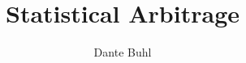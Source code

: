 \documentclass{article}
\begin{document}
\title{Statistical Arbitrage}
\author{Dante Buhl}


\newcommand{\wrms}{w_{\text{rms}}}
\newcommand{\Var}{\text{Var}}
\newcommand{\bs}[1]{\boldsymbol{#1}}
\newcommand{\hbs}[1]{\hat{\boldsymbol{#1}}}
\newcommand{\tb}[1]{\textbf{#1}}
\newcommand{\bmp}[1]{\begin{minipage}{#1\textwidth}}
\newcommand{\emp}{\end{minipage}}
\newcommand{\R}{\mathbb{R}}
\newcommand{\C}{\mathbb{C}}
\newcommand{\N}{\mathcal{N}}
\newcommand{\m}{\bs{\mu}_*}
\newcommand{\s}{\bs{\Sigma}_*}
\newcommand{\dt}{\Delta t}
\newcommand{\dx}{\Delta x}
\newcommand{\tr}[1]{\text{Tr}(#1)}
\newcommand{\Tr}[1]{\text{Tr}(#1)}
\newcommand{\Div}{\nabla \cdot}
\renewcommand{\div}{\nabla \cdot}
\newcommand{\Curl}{\nabla \times}
\newcommand{\Grad}{\nabla}
\newcommand{\grad}{\nabla}
\newcommand{\grads}{\nabla_s}
\newcommand{\gradf}{\nabla_f}
\newcommand{\xs}{x_s}
\newcommand{\x}{\bs{x}}
\newcommand{\xf}{x_f}
\newcommand{\ts}{t_s}
\newcommand{\tf}{t_f}
\newcommand{\pt}{\partial t}
\newcommand{\pz}{\partial z}
\newcommand{\uvec}{\bs{u}}
\newcommand{\bvec}{\bs{B}}
\newcommand{\nvec}{\hat{\bs{n}}}
\newcommand{\tu}{\tilde{\uvec}}
\newcommand{\B}{\bs{B}}
\newcommand{\A}{\bs{A}}
\newcommand{\jvec}{\bs{j}}
\newcommand{\F}{\bs{F}}
\newcommand{\T}{\tilde{T}}
\newcommand{\ez}{\bs{e}_z}
\newcommand{\ex}{\bs{e}_x}
\newcommand{\ey}{\bs{e}_y}
\newcommand{\eo}{\bs{e}_{\bs{\Omega}}}
\newcommand{\ppt}[1]{\frac{\partial #1}{\partial t}}
\newcommand{\pp}[2]{\frac{\partial #1}{\partial #2}}
\newcommand{\pptwo}[2]{\frac{\partial^2 #1}{\partial #2^2}}
\newcommand{\ddtwo}[2]{\frac{d^2 #1}{d #2^2}}
\newcommand{\DDt}[1]{\frac{D #1}{D t}}
\newcommand{\ppts}[1]{\frac{\partial #1}{\partial t_s}}
\newcommand{\pptf}[1]{\frac{\partial #1}{\partial t_f}}
\newcommand{\ppz}[1]{\frac{\partial #1}{\partial z}}
\newcommand{\ddz}[1]{\frac{d #1}{d z}}
\newcommand{\ppzetas}[1]{\frac{\partial^2 #1}{\partial \zeta^2}}
\newcommand{\ppzs}[1]{\frac{\partial #1}{\partial z_s}}
\newcommand{\ppzf}[1]{\frac{\partial #1}{\partial z_f}}
\newcommand{\ppx}[1]{\frac{\partial #1}{\partial x}}
\newcommand{\ddx}[1]{\frac{d #1}{d x}}
\newcommand{\ppxi}[1]{\frac{\partial #1}{\partial x_i}}
\newcommand{\ppxj}[1]{\frac{\partial #1}{\partial x_j}}
\newcommand{\ppy}[1]{\frac{\partial #1}{\partial y}}
\newcommand{\ppzeta}[1]{\frac{\partial #1}{\partial \zeta}}
\renewcommand{\k}{\bs{k}}
\newcommand{\real}[1]{\text{Re}\left[#1\right]}


\maketitle 
\setlength{\parindent}{0pt}
\end{document}
